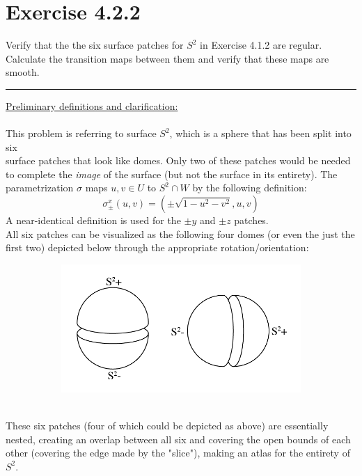 \documentclass[12pt]{article}
\begin{document}
\maketitle

\section*{Exercise 4.2.2}
Verify that the the six surface patches for $S^2$ in Exercise 4.1.2 are regular. Calculate the transition maps between them and verify that these maps are smooth.

\vspace{1cm}
\hrule
\vspace{1cm}
\noindent
\underline{Preliminary definitions and clarification:}\\\\
This problem is referring to surface $S^2$, which is a sphere that has been split into six \\ surface patches that look like domes. Only two of these patches would be needed to complete the \emph{image} of the surface (but not the surface in its entirety). The parametrization $\sigma$ maps $u,v \in U$ to $S^2 \cap W$ by the following definition:
$$
\sigma^{x}_{\pm}(u,v) = (\pm \sqrt{1-u^2-v^2}, u ,v)
$$
\indent
A near-identical definition is used for the $\pm y$ and $\pm z$ patches.\\
\indent
All six patches can be visualized as the following four domes (or even the just the first two) depicted below through the appropriate rotation/orientation:
\begin{figure}[h!]
  \centering
      \begin{subfigure}[b]{0.5\linewidth}
    \includegraphics[width=\linewidth]{./assets/4-2-2/s2-patches.png}
  \end{subfigure}
  \end{figure}
  \\
	\indent
	These six patches (four of which could be depicted as above) are essentially nested, creating an overlap between all six and covering the open bounds of each other (covering the edge made by the "slice"), making an atlas for the entirety of $S^2$.
\end{document}
